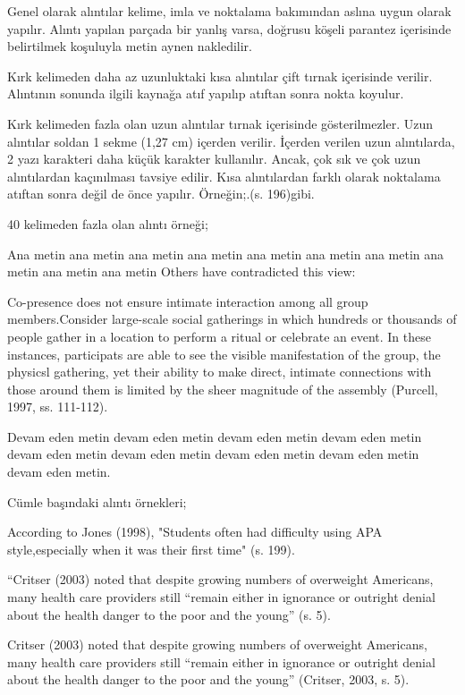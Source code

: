 Genel olarak alıntılar kelime, imla ve noktalama bakımından aslına uygun olarak yapılır. Alıntı yapılan parçada bir yanlış varsa, doğrusu köşeli parantez içerisinde belirtilmek koşuluyla metin aynen nakledilir.

Kırk kelimeden daha az uzunluktaki kısa alıntılar çift tırnak içerisinde verilir. Alıntının sonunda ilgili kaynağa atıf yapılıp atıftan sonra nokta koyulur. 

Kırk kelimeden fazla olan uzun alıntılar tırnak içerisinde gösterilmezler. Uzun alıntılar soldan 1 sekme (1,27 cm) içerden verilir. İçerden verilen uzun alıntılarda, 2 yazı karakteri daha küçük karakter kullanılır. Ancak, çok sık ve çok uzun alıntılardan kaçınılması tavsiye edilir. Kısa alıntılardan farklı olarak noktalama atıftan sonra değil de önce yapılır. Örneğin;.(s. 196)gibi.

40 kelimeden fazla olan alıntı örneği;

Ana metin ana metin ana metin ana metin ana metin ana metin ana metin ana metin ana metin ana metin Others have contradicted this view:

Co-presence does not ensure intimate interaction among all group members.Consider large-scale social gatherings in which hundreds or thousands of people gather in a location to perform a ritual or celebrate an event. In these instances, participats are able to see the visible manifestation of the group, the physicsl gathering, yet their ability to make direct, intimate  connections with those around them is limited by the sheer magnitude of the assembly (Purcell, 1997, ss. 111-112).

Devam eden metin devam eden metin devam eden metin devam eden metin devam eden metin devam eden metin devam eden metin devam eden metin devam eden metin.

Cümle başındaki alıntı örnekleri;

According to Jones (1998), "Students often had difficulty using APA style,especially when it was their first time" (s. 199).

“Critser (2003) noted that despite growing numbers of overweight Americans, many health care providers still “remain either in ignorance or outright denial about the health danger to the poor and the young” (s. 5).

Critser (2003) noted that despite growing numbers of overweight Americans, many health care providers still “remain either in ignorance or outright denial about the health danger to the poor and the young” (Critser, 2003, s. 5).


